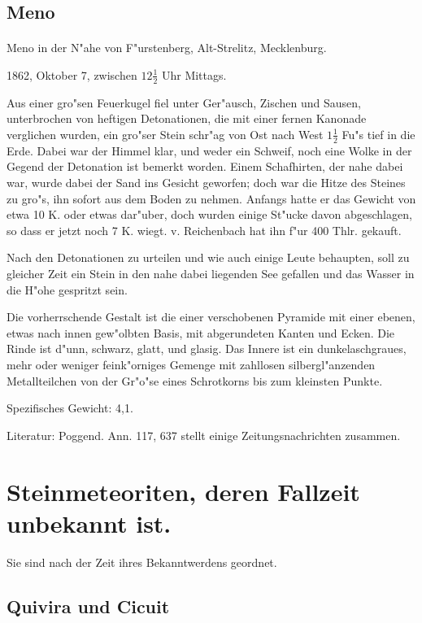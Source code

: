 \documentclass[a4paper, 11pt, oneside]{article}
\begin{document}
\subsection{Meno}
\normalsize
\paragraph{}
Meno in der N"ahe von F"urstenberg, Alt-Strelitz, Mecklenburg.

1862, Oktober 7, zwischen $12\frac{1}{2}$ Uhr Mittags.

Aus einer gro"sen Feuerkugel fiel unter Ger"ausch, Zischen und Sausen, unterbrochen von heftigen Detonationen, die mit einer fernen Kanonade verglichen wurden, ein gro"ser Stein schr"ag von Ost nach West $1\frac{1}{2}$ Fu"s tief in die Erde. Dabei war der Himmel klar, und weder ein Schweif, noch eine Wolke in der Gegend der Detonation ist bemerkt worden. Einem Schafhirten, der nahe dabei war, wurde dabei der Sand ins Gesicht geworfen; doch war die Hitze des Steines zu gro"s, ihn sofort aus dem Boden zu nehmen. Anfangs hatte er das Gewicht von etwa 10 K. oder etwas dar"uber, doch wurden einige St"ucke davon abgeschlagen, so dass er jetzt noch 7 K. wiegt. v. Reichenbach hat ihn f"ur 400 Thlr. gekauft.

Nach den Detonationen zu urteilen und wie auch einige Leute behaupten, soll zu gleicher Zeit ein Stein in den nahe dabei liegenden See gefallen und das Wasser in die H"ohe gespritzt sein.

Die vorherrschende Gestalt ist die einer verschobenen Pyramide mit einer ebenen, etwas nach innen gew"olbten Basis, mit abgerundeten Kanten und Ecken. Die Rinde ist d"unn, schwarz, glatt, und glasig. Das Innere ist ein dunkelaschgraues, mehr oder weniger feink"orniges Gemenge mit zahllosen silbergl"anzenden Metallteilchen von der Gr"o"se eines Schrotkorns bis zum kleinsten Punkte.

Spezifisches Gewicht: 4,1.

\footnotesize
Literatur: Poggend. Ann. 117, 637 stellt einige Zeitungsnachrichten zusammen.
\clearpage
\section{Steinmeteoriten, deren Fallzeit unbekannt ist.}
\normalsize
Sie sind nach der Zeit ihres Bekanntwerdens geordnet.

\subsection{Quivira und Cicuit}
\normalsize
\end{document}
